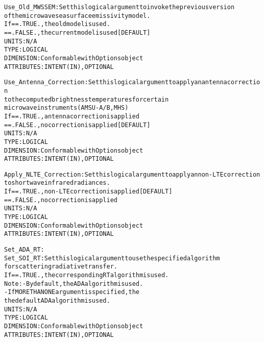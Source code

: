 \begin{alltt}
    Use_Old_MWSSEM:           Set this logical argument to invoke the previous version
                              of the microwave sea surface emissivity model.
                              If == .TRUE. , the old model is used.
                                 == .FALSE., the current model is used [DEFAULT]
                              UNITS:      N/A
                              TYPE:       LOGICAL
                              DIMENSION:  Conformable with Options object
                              ATTRIBUTES: INTENT(IN), OPTIONAL
               
    Use_Antenna_Correction:   Set this logical argument to apply an antenna correction
                              to the computed brightness temperatures for certain
                              microwave instruments (AMSU-A/B, MHS)
                              If == .TRUE. , antenna correction is applied
                                 == .FALSE., no correction is applied [DEFAULT]
                              UNITS:      N/A
                              TYPE:       LOGICAL
                              DIMENSION:  Conformable with Options object
                              ATTRIBUTES: INTENT(IN), OPTIONAL
                
    Apply_NLTE_Correction:    Set this logical argument to apply an non-LTE correction
                              to shortwave infrared radiances.
                              If == .TRUE. , non-LTE correction is applied [DEFAULT]
                                 == .FALSE., no correction is applied
                              UNITS:      N/A
                              TYPE:       LOGICAL
                              DIMENSION:  Conformable with Options object
                              ATTRIBUTES: INTENT(IN), OPTIONAL
                  
    Set_ADA_RT:
    Set_SOI_RT:               Set this logical argument to use the specified algorithm
                              for scattering radiative transfer.
                              If == .TRUE. , the corresponding RT algorithm is used.
                              Note: - By default, the ADA algorithm is used.
                                    - If MORE THAN ONE argument is specified, the
                                      the default ADA algorithm is used.
                              UNITS:      N/A
                              TYPE:       LOGICAL
                              DIMENSION:  Conformable with Options object
                              ATTRIBUTES: INTENT(IN), OPTIONAL
                                 

\end{alltt}
